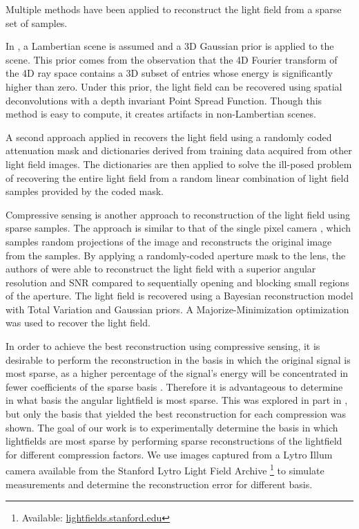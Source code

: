 \documentclass[10pt,twocolumn,letterpaper]{article}
\begin{document}
Multiple methods have been applied to reconstruct the light field from a sparse set of samples. 

In \cite{DimGapLFPrior}, a Lambertian scene is assumed and a 3D Gaussian prior is applied to the scene. This prior comes from the observation that the 4D Fourier transform of the 4D ray space contains a 3D subset of entries whose energy is significantly higher than zero. Under this prior, the light field can be recovered using spatial deconvolutions with a depth invariant Point Spread Function. Though this method is easy to compute, it creates artifacts in non-Lambertian scenes.

A second approach applied in \cite{LFDict} recovers the light field using a randomly coded attenuation mask and dictionaries derived from training data acquired from other light field images. The dictionaries are then applied to solve the ill-posed problem of recovering the entire light field from a random linear combination of light field samples provided by the coded mask.

Compressive sensing \cite{IntroCS}\cite{CompressiveSensingMega} is another approach to reconstruction of the light field using sparse samples. The approach is similar to that of the single pixel camera \cite{SinglePixelCamera}, which samples random projections of the image and reconstructs the original image from the samples. By applying a randomly-coded aperture mask to the lens, the authors of \cite{SparsityInCFD} were able to reconstruct the light field with a superior angular resolution and SNR compared to sequentially opening and blocking small regions of the aperture. The light field is recovered using a Bayesian reconstruction model with Total Variation and Gaussian priors. A Majorize-Minimization optimization was used to recover the light field.

In order to achieve the best reconstruction using compressive sensing, it is desirable to perform the reconstruction in the basis in which the original signal is most sparse, as a higher percentage of the signal's energy will be concentrated in fewer coefficients of the sparse basis \cite{CompressiveSensingMega}. Therefore it is advantageous to determine in what basis the angular lightfield is most sparse. This was explored in part in \cite{mainP1}, but only the basis that yielded the best reconstruction for each compression was shown. The goal of our work is to experimentally determine the basis in which lightfields are most sparse by performing sparse reconstructions of the lightfield for different compression factors. We use images captured from a Lytro Illum camera available from the Stanford Lytro Light Field Archive \footnote{Available: \url{lightfields.stanford.edu}} to simulate measurements and determine the reconstruction error for different basis.
\end{document}
